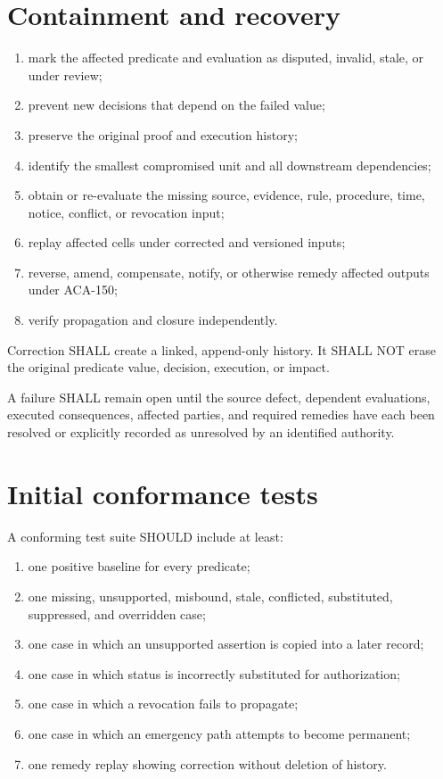 \section{Containment and recovery}
\begin{enumerate}
\item mark the affected predicate and evaluation as disputed, invalid, stale, or under review;
\item prevent new  decisions that depend on the failed value;
\item preserve the original proof and execution history;
\item identify the smallest compromised unit and all downstream dependencies;
\item obtain or re-evaluate the missing source, evidence, rule, procedure, time, notice, conflict, or revocation input;
\item replay affected cells under corrected and versioned inputs;
\item reverse, amend, compensate, notify, or otherwise remedy affected outputs under ACA-150;
\item verify propagation and closure independently.
\end{enumerate}

\begin{requirement}[ACA-160-004]
Correction SHALL create a linked, append-only history. It SHALL NOT erase the original predicate value, decision, execution, or impact.
\end{requirement}

\begin{requirement}[ACA-160-005]
A failure SHALL remain open until the source defect, dependent evaluations, executed consequences, affected parties, and required remedies have each been resolved or explicitly recorded as unresolved by an identified authority.
\end{requirement}

\section{Initial conformance tests}
A conforming test suite SHOULD include at least:
\begin{enumerate}
\item one positive baseline for every predicate;
\item one missing, unsupported, misbound, stale, conflicted, substituted, suppressed, and overridden case;
\item one case in which an unsupported assertion is copied into a later record;
\item one case in which status is incorrectly substituted for authorization;
\item one case in which a revocation fails to propagate;
\item one case in which an emergency path attempts to become permanent;
\item one remedy replay showing correction without deletion of history.
\end{enumerate}

